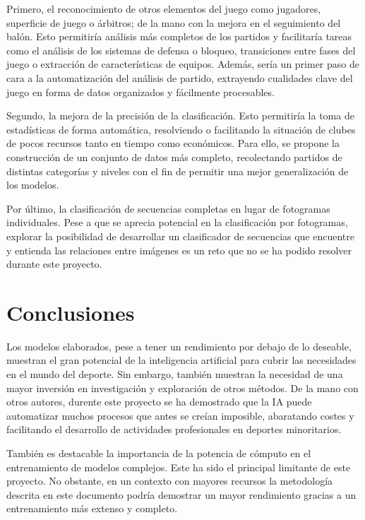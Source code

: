 \documentclass[12pt]{report} %
\begin{document}
    Primero, el reconocimiento de otros elementos del juego como jugadores,
    superficie de juego o árbitros; de la mano con la mejora en el seguimiento
    del balón. Esto permitiría análisis más completos de los partidos y
    facilitaría tareas como el análisis de los sistemas de defensa o bloqueo,
    transiciones entre fases del juego o extracción de características de
    equipos. Además, sería un primer paso de cara a la automatización del
    análisis de partido, extrayendo cualidades clave del juego en forma de
    datos organizados y fácilmente procesables.

    Segundo, la mejora de la precisión de la clasificación. Esto permitiría la
    toma de estadísticas de forma automática, resolviendo o facilitando la
    situación de clubes de pocos recursos tanto en tiempo como económicos. Para
    ello, se propone la construcción de un conjunto de datos más completo,
    recolectando partidos de distintas categorías y niveles con el fin de
    permitir una mejor generalización de los modelos.

    Por último, la clasificación de secuencias completas en lugar de fotogramas
    individuales. Pese a que se aprecia potencial en la clasificación por
    fotogramas, explorar la posibilidad de desarrollar un clasificador de
    secuencias que encuentre y entienda las relaciones entre imágenes es un
    reto que no se ha podido resolver durante este proyecto.
    

    \chapter{Conclusiones}
    \label{chap:conclusion}

    Los modelos elaborados, pese a tener un rendimiento por debajo de lo deseable, muestran el gran potencial de la inteligencia artificial para cubrir las necesidades en el mundo del deporte. Sin embargo, también muestran la necesidad de una mayor inversión en investigación y exploración de otros métodos. De la mano con otros autores, durente este proyecto se ha demostrado que la IA puede automatizar muchos procesos que antes se creían imposible, abaratando costes y facilitando el desarrollo de actividades profesionales en deportes minoritarios. 

    También es destacable la importancia de la potencia de cómputo en el entrenamiento de modelos complejos. Este ha sido el principal limitante de este proyecto. No obstante, en un contexto con mayores recursos la metodología descrita en este documento podría demostrar un mayor rendimiento gracias a un entrenamiento más extenso y completo.
\end{document}

